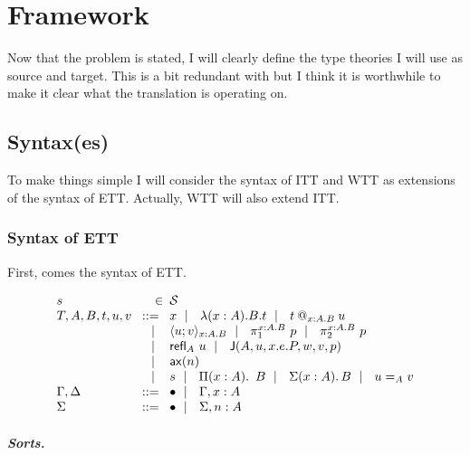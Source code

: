 \chapter{Framework}

Now that the problem is stated, I will clearly define the type theories I will
use as source and target. This is a bit redundant with  but I
think it is worthwhile to make it clear what the translation is operating on.

\section{Syntax(es)}

To make things simple I will consider the syntax of \acrshort{ITT} and
\acrshort{WTT} as extensions of the syntax of \acrshort{ETT}.
Actually, \acrshort{WTT} will also extend \acrshort{ITT}.

\subsection{Syntax of \acrshort{ETT}}

First, comes the syntax of \acrshort{ETT}.

\[
  \begin{array}{l@{~\,}r@{~\,}l}
    s &\in& \cS \\
    T,A,B,t,u,v &\bnf& x \bnfor \lam{x:A}{B} t \bnfor \app{t}{x:A}{B}{u} \\
    &\bnfor& \pair{x:A}{B}{u}{v} \bnfor \pio{x:A}{B}{p} \bnfor \pit{x:A}{B}{p} \\
    &\bnfor& \refl{A} u \bnfor \J{A}{u}{x.e.P}{w}{v}{p} \\
    &\bnfor& \ax{n} \\
    &\bnfor& s \bnfor \Prod{x:A} B \bnfor \Sum{x:A} B \bnfor \Eq{A}{u}{v} \\
    \Ga, \D &\bnf& \ctxempty \bnfor \Ga, x:A \\
    \Sigma &\bnf& \ctxempty \bnfor \Sigma, n:A
  \end{array}
\]

\paragraph{Sorts.}


